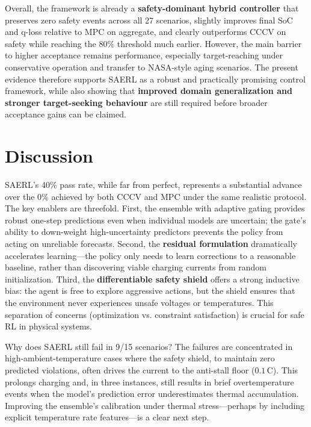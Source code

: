 \documentclass[%
 aip,
 amsmath,amssymb,
reprint, onecolumn %
]{revtex4-1}
\begin{document}
Overall, the framework is already a \textbf{safety-dominant hybrid controller} that preserves zero safety events across all 27 scenarios, slightly improves final SoC and q-loss relative to MPC on aggregate, and clearly outperforms CCCV on safety while reaching the 80\% threshold much earlier. However, the main barrier to higher acceptance remains performance, especially target-reaching under conservative operation and transfer to NASA-style aging scenarios. The present evidence therefore supports SAERL as a robust and practically promising control framework, while also showing that \textbf{improved domain generalization and stronger target-seeking behaviour} are still required before broader acceptance gains can be claimed.

\section{Discussion}
\label{sec:discussion}

SAERL's 40\% pass rate, while far from perfect, represents a substantial advance over the 0\% achieved by both CCCV and MPC under the same realistic protocol. The key enablers are threefold. First, the ensemble with adaptive gating provides robust one-step predictions even when individual models are uncertain; the gate's ability to down-weight high-uncertainty predictors prevents the policy from acting on unreliable forecasts. Second, the \textbf{residual formulation} dramatically accelerates learning---the policy only needs to learn corrections to a reasonable baseline, rather than discovering viable charging currents from random initialization. Third, the \textbf{differentiable safety shield} offers a strong inductive bias: the agent is free to explore aggressive actions, but the shield ensures that the environment never experiences unsafe voltages or temperatures. This separation of concerns (optimization vs. constraint satisfaction) is crucial for safe RL in physical systems.

Why does SAERL still fail in 9/15 scenarios? The failures are concentrated in high-ambient-temperature cases where the safety shield, to maintain zero predicted violations, often drives the current to the anti-stall floor ($0.1\,\mathrm{C}$). This prolongs charging and, in three instances, still results in brief overtemperature events when the model's prediction error underestimates thermal accumulation. Improving the ensemble's calibration under thermal stress---perhaps by including explicit temperature rate features---is a clear next step.
\end{document}
